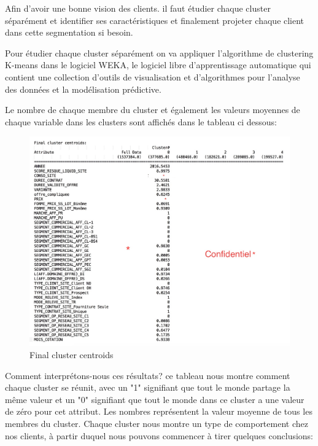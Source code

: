 \documentclass[12pt]{article}
\begin{document}
{Afin d’avoir une bonne vision des clients. il faut étudier chaque cluster séparément et identifier ses caractéristiques et finalement projeter chaque client dans cette segmentation si besoin.

Pour étudier chaque cluster séparément on va appliquer l’algorithme de clustering K-means dans le logiciel WEKA, le logiciel libre d'apprentissage automatique qui contient une collection d'outils de visualisation et d'algorithmes pour l'analyse des données et la modélisation prédictive.

Le nombre de chaque membre du cluster et également les valeurs moyennes de chaque variable dans les clusters sont affichés dans le tableau ci dessous:


\begin{figure}[H]
	\centering
    \includegraphics[width=1\textwidth]{image39.png}
     \caption{Final cluster centroids}
    \label{fig:39}
\end{figure}



Comment interprétons-nous ces résultats? ce tableau nous montre comment chaque cluster se réunit, avec un "1" signifiant que tout le monde partage la même valeur et un "0" signifiant que tout le monde dans ce cluster a une valeur de zéro pour cet attribut. 
Les nombres représentent la valeur moyenne de tous les membres du cluster. Chaque cluster nous montre un type de comportement chez nos clients, à partir duquel nous pouvons commencer à tirer quelques conclusions:

}
\end{document}
